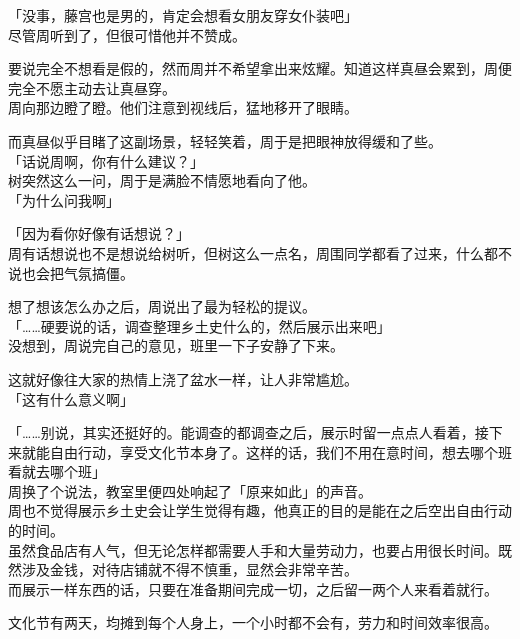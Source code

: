 「没事，藤宫也是男的，肯定会想看女朋友穿女仆装吧」\\

尽管周听到了，但很可惜他并不赞成。

要说完全不想看是假的，然而周并不希望拿出来炫耀。知道这样真昼会累到，周便完全不愿主动去让真昼穿。\\

周向那边瞪了瞪。他们注意到视线后，猛地移开了眼睛。

而真昼似乎目睹了这副场景，轻轻笑着，周于是把眼神放得缓和了些。\\

「话说周啊，你有什么建议？」\\

树突然这么一问，周于是满脸不情愿地看向了他。\\

「为什么问我啊」

「因为看你好像有话想说？」\\

周有话想说也不是想说给树听，但树这么一点名，周围同学都看了过来，什么都不说也会把气氛搞僵。

想了想该怎么办之后，周说出了最为轻松的提议。\\

「……硬要说的话，调查整理乡土史什么的，然后展示出来吧」\\

没想到，周说完自己的意见，班里一下子安静了下来。

这就好像往大家的热情上浇了盆水一样，让人非常尴尬。\\

「这有什么意义啊」

「……别说，其实还挺好的。能调查的都调查之后，展示时留一点点人看着，接下来就能自由行动，享受文化节本身了。这样的话，我们不用在意时间，想去哪个班看就去哪个班」\\

周换了个说法，教室里便四处响起了「原来如此」的声音。\\

周也不觉得展示乡土史会让学生觉得有趣，他真正的目的是能在之后空出自由行动的时间。\\

虽然食品店有人气，但无论怎样都需要人手和大量劳动力，也要占用很长时间。既然涉及金钱，对待店铺就不得不慎重，显然会非常辛苦。\\

而展示一样东西的话，只要在准备期间完成一切，之后留一两个人来看着就行。

文化节有两天，均摊到每个人身上，一个小时都不会有，劳力和时间效率很高。


